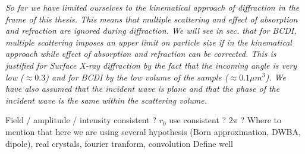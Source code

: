 \textit{
So far we have limited ourselves to the kinematical approach of diffraction in the frame of this thesis.
This means that multiple scattering and effect of absorption and refraction are ignored during diffraction.
We will see in sec. that for BCDI, multiple scattering imposes an upper limit on particle size if in the kinematical approach while effect of absorption and refraction can be corrected.
This is justified for Surface X-ray diffraction by the fact that the incoming angle is very low ($\approx 0.3$) and for BCDI by the low volume of the sample ($\approx 0.1 \mu m^3$).
We have also assumed that the incident wave is plane and that the phase of the incident wave is the same within the scattering volume.
}

\textcolor{Important}{Field / amplitude / intensity consistent ? $r_0$ use consistent ? $2\pi$ ? Where to mention that here we are using several hypothesis (Born approximation, DWBA, dipole), real crystals, fourier tranform, convolution
Define well}

